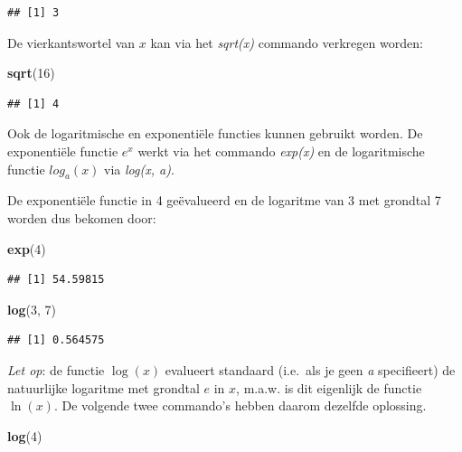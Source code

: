 \documentclass[
]{book}
\newenvironment{Shaded}{\begin{snugshade}}{\end{snugshade}}
\newcommand{\DecValTok}[1]{\textcolor[rgb]{0.00,0.00,0.81}{#1}}
\newcommand{\FunctionTok}[1]{\textcolor[rgb]{0.13,0.29,0.53}{\textbf{#1}}}
\newcommand{\NormalTok}[1]{#1}
\begin{document}
\begin{verbatim}
## [1] 3
\end{verbatim}

De vierkantswortel van \(x\) kan via het \emph{sqrt(x)} commando verkregen worden:

\begin{Shaded}
\begin{Highlighting}[]
\FunctionTok{sqrt}\NormalTok{(}\DecValTok{16}\NormalTok{)}
\end{Highlighting}
\end{Shaded}

\begin{verbatim}
## [1] 4
\end{verbatim}

Ook de logaritmische en exponentiële functies kunnen gebruikt worden. De
exponentiële functie \(e^x\) werkt via het commando \emph{exp(x)} en de logaritmische
functie \(log_a(x)\) via \emph{log(x, a)}.

De exponentiële functie in 4 geëvalueerd en de logaritme van 3 met grondtal 7 worden
dus bekomen door:

\begin{Shaded}
\begin{Highlighting}[]
\FunctionTok{exp}\NormalTok{(}\DecValTok{4}\NormalTok{)}
\end{Highlighting}
\end{Shaded}

\begin{verbatim}
## [1] 54.59815
\end{verbatim}

\begin{Shaded}
\begin{Highlighting}[]
\FunctionTok{log}\NormalTok{(}\DecValTok{3}\NormalTok{, }\DecValTok{7}\NormalTok{)}
\end{Highlighting}
\end{Shaded}

\begin{verbatim}
## [1] 0.564575
\end{verbatim}

\emph{Let op}: de functie \(\log(x)\) evalueert standaard (i.e.~als je geen \emph{a} specifieert) de natuurlijke logaritme met grondtal \(e\) in \(x\), m.a.w. is dit eigenlijk de functie \(\ln(x)\). De volgende twee commando's hebben daarom dezelfde oplossing.

\begin{Shaded}
\begin{Highlighting}[]
\FunctionTok{log}\NormalTok{(}\DecValTok{4}\NormalTok{)}
\end{Highlighting}
\end{Shaded}
\end{document}
